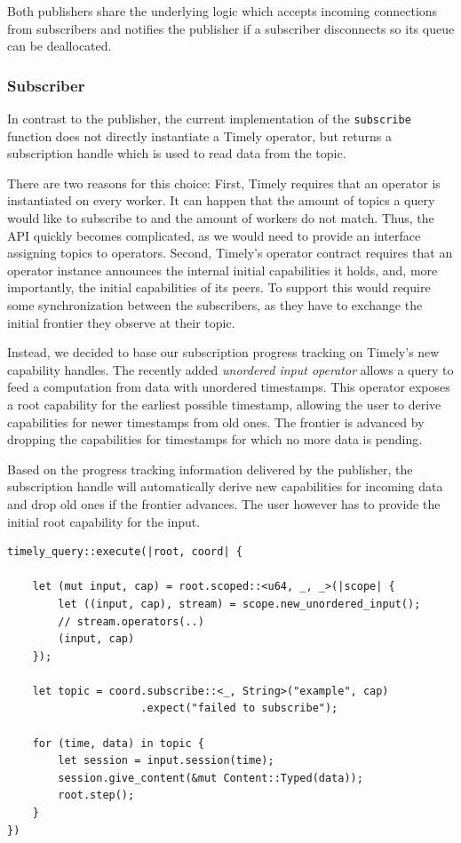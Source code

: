 Both publishers share the underlying logic which accepts incoming connections
from subscribers and notifies the publisher if a subscriber disconnects so
its queue can be deallocated.

\subsubsection{Subscriber}

In contrast to the publisher, the current implementation of the \lstinline{subscribe}
function does not directly instantiate a Timely operator, but returns a subscription
handle which is used to read data from the topic.

There are two reasons for this choice: First, Timely requires that an operator
is instantiated on every worker. It can happen that the amount of topics a query
would like to subscribe to and the amount of workers do not match. Thus, the API
quickly becomes complicated, as we would need to provide an interface assigning
topics to operators.
Second, Timely's operator contract requires that an operator instance announces
the internal initial capabilities it holds, and, more importantly, the initial
capabilities of its peers. To support this would require some synchronization
between the subscribers, as they have to exchange the initial frontier they
observe at their topic.

Instead, we decided to base our subscription progress tracking on Timely's new
capability handles. The recently added \emph{unordered input operator} allows
a query to feed a computation from data with unordered timestamps. This operator
exposes a root capability for the earliest possible timestamp, allowing the user
to derive capabilities for newer timestamps from old ones. The frontier
is advanced by dropping the capabilities for timestamps for which no more data
is pending.

Based on the progress tracking information delivered by the publisher, the
subscription handle will automatically derive new capabilities for incoming
data and drop old ones if the frontier advances. The user however has to
provide the initial root capability for the input.

\begin{lstlisting}[caption={[Typical use of the subscription handle]
Typical use of the subscription handle. This query subscribes to a single topic of
strings, with \lstinline{u64} being the type of the timestamps.
}]
timely_query::execute(|root, coord| {

    let (mut input, cap) = root.scoped::<u64, _, _>(|scope| {
        let ((input, cap), stream) = scope.new_unordered_input();
        // stream.operators(..)
        (input, cap)
    });

    let topic = coord.subscribe::<_, String>("example", cap)
                     .expect("failed to subscribe");

    for (time, data) in topic {
        let session = input.session(time);
        session.give_content(&mut Content::Typed(data));
        root.step();
    }
})
\end{lstlisting}

